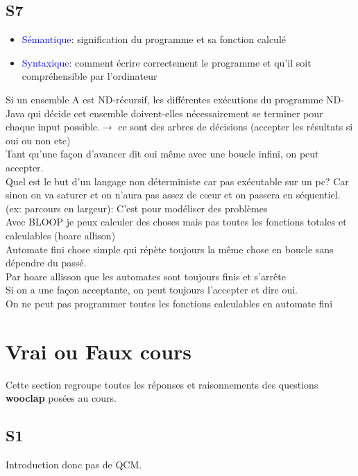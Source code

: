 \documentclass{report}
\begin{document}
\section{S7}
\begin{itemize}
\item \textcolor{blue}{Sémantique}: signification du programme et sa fonction calculé
\item \textcolor{blue}{Syntaxique}: comment écrire correctement le programme et qu'il soit compréhensible par l'ordinateur
\end{itemize}

Si un ensemble A est ND-récursif, les différentes exécutions du programme ND-Java qui décide cet ensemble doivent-elles nécessairement se terminer pour chaque input possible.$\rightarrow$ ce sont des arbres de décisions (accepter les résultats si oui ou non etc)\\

Tant qu'une façon d'avancer dit oui même avec une boucle infini, on peut accepter.\\
Quel est le but d'un langage non déterministe car pas exécutable sur un pc? Car sinon on va saturer et on n'aura pas assez de cœur et on passera en séquentiel. (ex: parcours en largeur): C'est pour modéliser des problèmes\\

Avec BLOOP je peux calculer des choses mais pas toutes les fonctions totales et calculables (hoare allison)\\

Automate fini chose simple qui répète toujours la même chose en boucle sans dépendre du passé.\\

Par hoare allisson que les automates sont toujours finis et s'arrête\\

Si on a une façon acceptante, on peut toujours l'accepter et dire oui.\\

On ne peut pas programmer toutes les fonctions calculables en automate fini

\chapter{Vrai ou Faux cours} %
Cette section regroupe toutes les réponses et raisonnements des questions \textbf{wooclap} posées au cours.

\section{S1}
Introduction donc pas de QCM.
\end{document}
